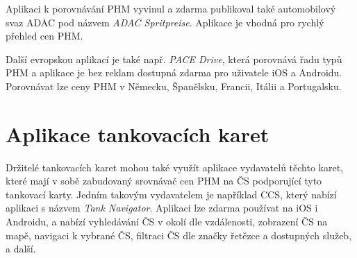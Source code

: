 Aplikaci k porovnávání PHM vyvinul a zdarma publikoval také automobilový
svaz ADAC pod názvem \emph{ADAC Spritpreise}. Aplikace je vhodná pro rychlý
přehled cen PHM.
\cite{r6fadX3YRnFIir68}

Další evropskou aplikací je také např. \emph{PACE Drive}, která
porovnává řadu typů PHM a aplikace je bez reklam dostupná zdarma
pro uživatele iOS a Androidu. Porovnávat lze ceny PHM v Německu,
Španělsku, Francii, Itálii a Portugalsku.
\cite{r6fadX3YRnFIir68}

\section{Aplikace tankovacích karet}
Držitelé tankovacích karet mohou také využít aplikace vydavatelů těchto
karet, které mají v sobě zabudovaný srovnávač cen PHM na ČS podporující
tyto tankovací karty. Jedním takovým vydavatelem je například CCS, který
nabízí aplikaci s názvem \emph{Tank Navigator}. Aplikaci lze zdarma
používat na iOS i Androidu, a nabízí vyhledávání ČS v okolí dle vzdálenosti,
zobrazení ČS na mapě, navigaci k vybrané ČS, filtraci ČS dle značky řetězce
a dostupných služeb, a další.
\cite{Khcm5FZT2rH5pABQ}

\endinput
